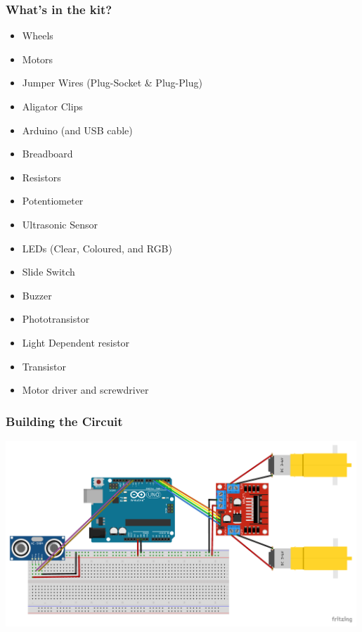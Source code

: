\documentclass[compress]{beamer}
\begin{document}
\begin{frame}[fragile]
    \frametitle{What's in the kit?}
    \begin{itemize}
        \item <1-> {\color{NordRed}Wheels}
        \item <2-> {\color{NordRed}Motors}
        \item <3-> {\color{NordRed}Jumper Wires (Plug-Socket \& Plug-Plug)}
        \item <4-> {\color{NordRed} Aligator Clips}
        \item <5-> {\color{NordRed} Arduino (and USB cable)}
        \item <6-> {\color{NordRed} Breadboard}
        \item <7-> {\color{NordRed} Resistors}
        \item <8-> Potentiometer
        \item <9-> {\color{NordRed}Ultrasonic Sensor}
        \item <10-> LEDs (Clear, Coloured, and RGB)
        \item <11-> Slide Switch
        \item <12-> Buzzer
        \item <13-> Phototransistor
        \item <14-> Light Dependent resistor
        \item <15-> Transistor
        \item <16-> {\color{NordRed}Motor driver and screwdriver}
    \end{itemize}
\end{frame}

\begin{frame}[fragile]
    \frametitle{Building the Circuit}
    \includegraphics[height=7cm]{pictures/circuit.pdf}
\end{frame}
\end{document}
